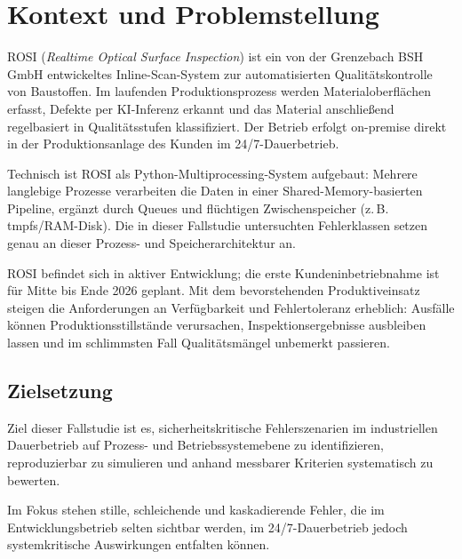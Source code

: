 
\section{Kontext und Problemstellung}

ROSI (\textit{Realtime Optical Surface Inspection}) ist ein von der Grenzebach BSH GmbH
entwickeltes Inline-Scan-System zur automatisierten Qualitätskontrolle von Baustoffen.
Im laufenden Produktionsprozess werden Materialoberflächen erfasst, Defekte per
KI-Inferenz erkannt und das Material anschließend regelbasiert in Qualitätsstufen
klassifiziert. Der Betrieb erfolgt on-premise direkt in der Produktionsanlage des
Kunden im 24/7-Dauerbetrieb.

Technisch ist ROSI als Python-Multiprocessing-System aufgebaut: Mehrere langlebige
Prozesse verarbeiten die Daten in einer Shared-Memory-basierten Pipeline, ergänzt
durch Queues und flüchtigen Zwischenspeicher (z.\,B. tmpfs/RAM-Disk). Die in dieser
Fallstudie untersuchten Fehlerklassen setzen genau an dieser Prozess- und
Speicherarchitektur an.

ROSI befindet sich in aktiver Entwicklung; die erste Kundeninbetriebnahme ist für
Mitte bis Ende 2026 geplant. Mit dem bevorstehenden Produktiveinsatz steigen die
Anforderungen an Verfügbarkeit und Fehlertoleranz erheblich: Ausfälle können
Produktionsstillstände verursachen, Inspektionsergebnisse ausbleiben lassen und im
schlimmsten Fall Qualitätsmängel unbemerkt passieren.

\subsection{Zielsetzung}

Ziel dieser Fallstudie ist es, sicherheitskritische Fehlerszenarien im industriellen
Dauerbetrieb auf Prozess- und Betriebssystemebene zu identifizieren, reproduzierbar
zu simulieren und anhand messbarer Kriterien systematisch zu bewerten.

Im Fokus stehen stille, schleichende und kaskadierende Fehler, die im
Entwicklungsbetrieb selten sichtbar werden, im 24/7-Dauerbetrieb jedoch
systemkritische Auswirkungen entfalten können.
